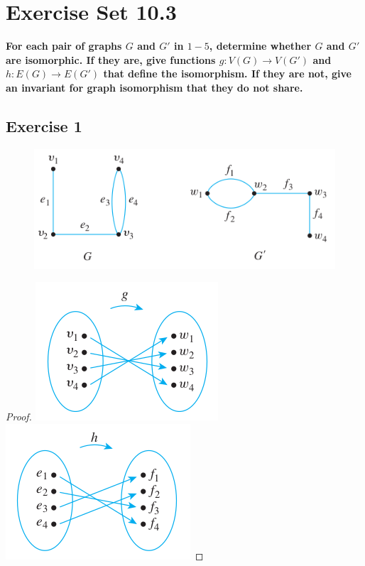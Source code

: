 \documentclass[14pt]{extarticle}
\newcommand{\cy}{\color{cyan}}
\begin{document}
\section{Exercise Set 10.3}
{\bf \cy For each pair of graphs \(G\) and \(G'\) in \(1-5\), determine whether \(G\) and \(G'\) are isomorphic. If they 
are, give functions \(g: V(G) \to V(G')\) and \(h: E(G) \to E(G')\) that define the isomorphism. If they are not, give an 
invariant for graph isomorphism that they do not share.}

\subsection{Exercise 1}
\begin{figure}[ht!]
\centering
\includegraphics[scale=0.55]{../images/10.3.1.png}
\end{figure}

\begin{proof}
\includegraphics[scale=0.5]{../images/10.3.1.a.png}
\includegraphics[scale=0.5]{../images/10.3.1.b.png}
\end{proof}
\end{document}
